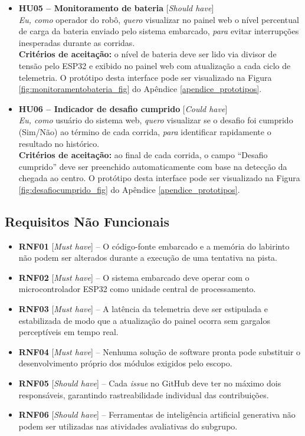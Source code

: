 \begin{itemize}
\item \textbf{HU05 – Monitoramento de bateria} [\textit{Should have}]\\
\textit{Eu, como} operador do robô, \textit{quero} visualizar no painel web o nível percentual de carga da bateria enviado pelo sistema embarcado, \textit{para} evitar interrupções inesperadas durante as corridas.\\
\textbf{Critérios de aceitação:} o nível de bateria deve ser lido via divisor de tensão pelo ESP32 e exibido no painel web com atualização a cada ciclo de telemetria. O protótipo desta interface pode ser visualizado na Figura \ref{fig:monitoramentobateria_fig} do Apêndice \ref{apendice_prototipos}.

\item \textbf{HU06 – Indicador de desafio cumprido} [\textit{Could have}]\\
\textit{Eu, como} usuário do sistema web, \textit{quero} visualizar se o desafio foi cumprido (Sim/Não) ao término de cada corrida, \textit{para} identificar rapidamente o resultado no histórico.\\
\textbf{Critérios de aceitação:} ao final de cada corrida, o campo ``Desafio cumprido'' deve ser preenchido automaticamente com base na detecção da chegada ao centro. O protótipo desta interface pode ser visualizado na Figura \ref{fig:desafiocumprido_fig} do Apêndice \ref{apendice_prototipos}.
 
\end{itemize}
 
\subsection{Requisitos Não Funcionais}
 
\begin{itemize}
    \item \textbf{RNF01} [\textit{Must have}] – O código-fonte embarcado e a memória do labirinto não podem ser alterados durante a execução de uma tentativa na pista.
    \item \textbf{RNF02} [\textit{Must have}] – O sistema embarcado deve operar com o microcontrolador ESP32 como unidade central de processamento.
    \item \textbf{RNF03} [\textit{Must have}] – A latência da telemetria deve ser estipulada e estabilizada de modo que a atualização do painel ocorra sem gargalos perceptíveis em tempo real.
    \item \textbf{RNF04} [\textit{Must have}] – Nenhuma solução de software pronta pode substituir o desenvolvimento próprio dos módulos exigidos pelo escopo.
    \item \textbf{RNF05} [\textit{Should have}] – Cada \textit{issue} no GitHub deve ter no máximo dois responsáveis, garantindo rastreabilidade individual das contribuições.
    \item \textbf{RNF06} [\textit{Should have}] – Ferramentas de inteligência artificial generativa não podem ser utilizadas nas atividades avaliativas do subgrupo.
\end{itemize}

